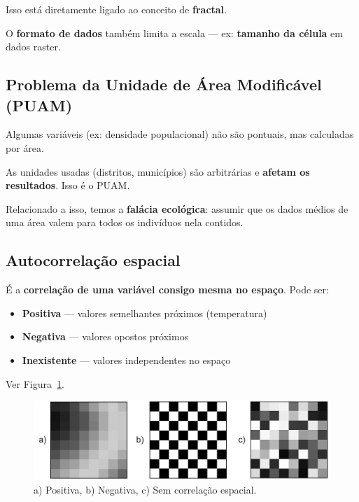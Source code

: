 Isso está diretamente ligado ao conceito de \textbf{fractal}.

O \textbf{formato de dados} também limita a escala — ex: \textbf{tamanho da célula} em dados raster.

\subsection{Problema da Unidade de Área Modificável (PUAM)}

Algumas variáveis (ex: densidade populacional) não são pontuais, mas calculadas por área.

As unidades usadas (distritos, municípios) são arbitrárias e \textbf{afetam os resultados}. Isso é o PUAM.

Relacionado a isso, temos a \textbf{falácia ecológica}: assumir que os dados médios de uma área valem para todos os indivíduos nela contidos.

\subsection{Autocorrelação espacial}

É a \textbf{correlação de uma variável consigo mesma no espaço}. Pode ser:

\begin{itemize}
 \item \textbf{Positiva} — valores semelhantes próximos (temperatura)
 \item \textbf{Negativa} — valores opostos próximos
 \item \textbf{Inexistente} — valores independentes no espaço
\end{itemize}

Ver Figura~\ref{Fig:Autocorrelacion_espacial}.

\begin{figure}[!hbt]   
\centering
\includegraphics[width=\textwidth]{Analises/Autocorrelacion_espacial.png}
\caption{\small a) Positiva, b) Negativa, c) Sem correlação espacial.}
\label{Fig:Autocorrelacion_espacial} 
\end{figure}

